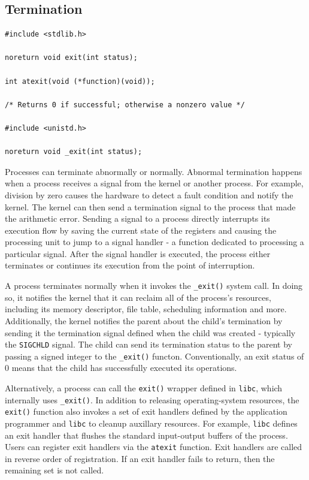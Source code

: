 \subsection{Termination}
\label{ch:fundamentals/processes/termination}
\begin{lstlisting}[style=syscalls, caption={Exit System Call and Wrappers}]
#include <stdlib.h>

noreturn void exit(int status);

int atexit(void (*function)(void));

/* Returns 0 if successful; otherwise a nonzero value */

#include <unistd.h>

noreturn void _exit(int status);
\end{lstlisting}

Processes can terminate abnormally or normally. Abnormal termination happens when a process 
receives a signal from the kernel or another process. For example, division by zero causes 
the hardware to detect a fault condition and notify the kernel. The kernel can then send a termination 
signal to the process that made the arithmetic error. Sending a signal to a process directly 
interrupts its execution flow by saving the current state of the registers and causing the processing 
unit to jump to a signal handler - a function dedicated to processing a particular signal. 
After the signal handler is executed, the process either terminates or continues its execution from 
the point of interruption. 

A process terminates normally when it invokes the \verb|_exit()| system call. In doing so, it notifies the 
kernel that it can reclaim all of the process's resources, including its memory descriptor, 
file table, scheduling information and more. Additionally, the kernel notifies the parent 
about the child's termination by sending it the termination signal defined when the child was created - 
typically the \verb|SIGCHLD| signal. The child can send its termination status to the parent
by passing a signed integer to the \verb|_exit()| functon. Conventionally, an exit status of 0 
means that the child has successfully executed its operations.

Alternatively, a process can call the \verb|exit()| wrapper defined in \verb|libc|, which internally 
uses \verb|_exit()|.
In addition to releasing operating-system resources, the \verb|exit()| function also invokes 
a set of exit handlers defined by the application programmer and \verb|libc| to cleanup auxillary
resources. For example, \verb|libc| defines an exit handler that flushes the standard input-output 
buffers of the process. Users can register exit handlers via the \verb|atexit| function. 
Exit handlers are called in reverse order of registration. If an exit handler fails to return, then 
the remaining set is not called. 

